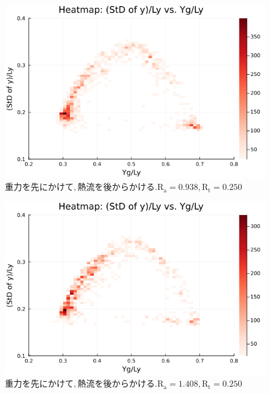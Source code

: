 \begin{figure}[H]
  \centering
  \includegraphics[scale=0.6]{image/RaRtmap_drop_heat/2023-12-21T10:44:58.051_RaRtmap_chi1.265_Ay50_rho0.4_T0.43_dT0.04_Rd0.0_Rt0.25_Ra0.938769_g0.0003999718779659611_run4.0e7.png}
  \caption{$重力を先にかけて, 熱流を後からかける. \text{R}_\text{a}=0.938,\text{R}_\text{t}=0.250$}
  \label{}
\end{figure}

\begin{figure}[H]
  \centering
  \includegraphics[scale=0.6]{image/RaRtmap_drop_heat/2023-12-21T10:44:58.129_RaRtmap_chi1.265_Ay50_rho0.4_T0.43_dT0.04_Rd0.0_Rt0.25_Ra1.4081535_g0.0003999718779659611_run4.0e7.png}
  \caption{$重力を先にかけて, 熱流を後からかける. \text{R}_\text{a}=1.408,\text{R}_\text{t}=0.250$}
  \label{}
\end{figure}

